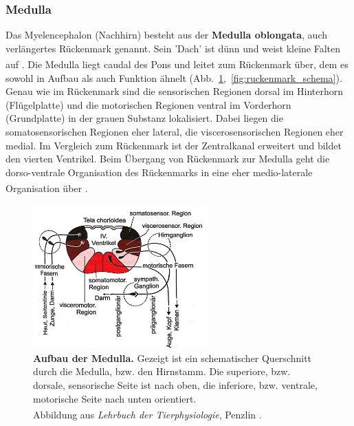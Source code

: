 \documentclass[12pt,a4paper,pdftex]{article}
\begin{document}
\subsubsection{Medulla} 

Das Myelencephalon (Nachhirn) besteht aus der \textbf{Medulla oblongata}, auch verlängertes Rückenmark genannt. Sein 'Dach' ist dünn und weist kleine Falten auf \textsuperscript{\cite[6]{storch2012lehrbuchzoo}}. Die Medulla liegt caudal des Pons und leitet zum Rückenmark über, dem es sowohl in Aufbau als auch Funktion ähnelt (Abb.~\ref{fig:medulla_schema},~\ref{fig:ruckenmark_schema}). Genau wie im Rückenmark sind die sensorischen Regionen dorsal im Hinterhorn (Flügelplatte) und die motorischen Regionen ventral im Vorderhorn (Grundplatte) in der grauen Substanz lokalisiert. Dabei liegen die somatosensorischen Regionen eher lateral, die viscerosensorischen Regionen eher medial. Im Vergleich zum Rückenmark ist der Zentralkanal erweitert und bildet den vierten Ventrikel. Beim Übergang von Rückenmark zur Medulla geht die dorso-ventrale Organisation des Rückenmarks in eine eher medio-laterale  Organisation über \textsuperscript{\cite[14]{penzlin2005tierphys}}.

\begin{figure}[H]
    \centering
    \includegraphics[width=0.6\textwidth]{pictures/Bilder_Jule/Andere/medulla_schema.jpg}
    \caption[Aufbau der Medulla]{\textbf{Aufbau der Medulla.} Gezeigt ist ein schematischer Querschnitt durch die Medulla, bzw. den Hirnstamm. Die superiore, bzw. dorsale, sensorische Seite ist nach oben, die inferiore, bzw. ventrale, motorische Seite nach unten orientiert.\\
    Abbildung aus \textit{Lehrbuch der Tierphysiologie}, Penzlin {\textsuperscript{\cite[14]{penzlin2005tierphys}}}.}
    \label{fig:medulla_schema}
\end{figure}{}
\end{document}
